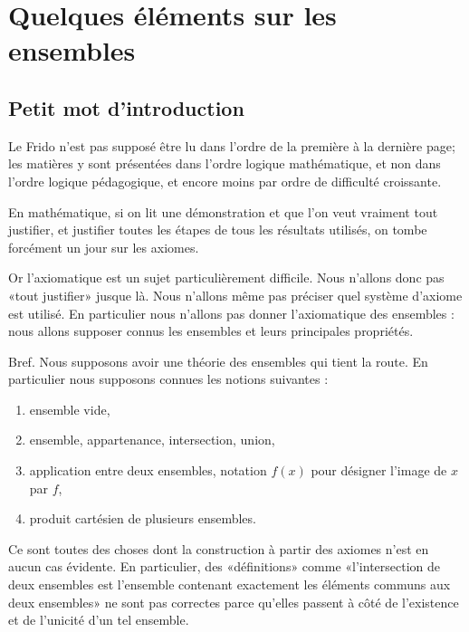 
\section{Quelques éléments sur les ensembles}

\subsection{Petit mot d'introduction}

\begin{normaltext}

Le Frido n'est pas supposé être lu dans l'ordre de la première à la dernière page; les matières y sont présentées dans l'ordre logique mathématique, et non dans l'ordre logique pédagogique, et encore moins par ordre de difficulté croissante.

En mathématique, si on lit une démonstration et que l'on veut vraiment tout justifier, et justifier toutes les étapes de tous les résultats utilisés, on tombe forcément un jour sur les axiomes.

Or l'axiomatique est un sujet particulièrement difficile. Nous n'allons donc pas «tout justifier» jusque là. Nous n'allons même pas préciser quel système d'axiome est utilisé. En particulier nous n'allons pas donner l'axiomatique des ensembles : nous allons supposer connus les ensembles et leurs principales propriétés.

Bref. Nous supposons avoir une théorie des ensembles qui tient la route. En particulier nous supposons connues les notions suivantes :
\begin{enumerate}
    \item
        ensemble vide,
    \item
        ensemble, appartenance, intersection, union,
    \item
        application entre deux ensembles, notation \( f(x)\) pour désigner l'image de \( x\) par \( f\),
    \item
        produit cartésien de plusieurs ensembles.
\end{enumerate}
Ce sont toutes des choses dont la construction à partir des axiomes n'est en aucun cas évidente. En particulier, des «définitions» comme «l'intersection de deux ensembles est l'ensemble contenant exactement les éléments communs aux deux ensembles» ne sont pas correctes parce qu'elles passent à côté de l'existence et de l'unicité d'un tel ensemble.
\end{normaltext}

